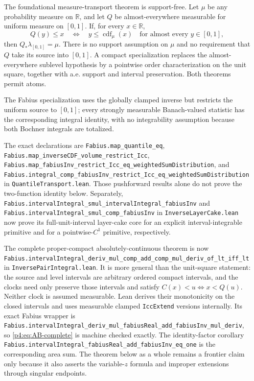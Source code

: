 \documentclass[11pt,oneside]{article}
\theoremstyle{definition}
\theoremstyle{remark}
\newcommand{\R}{\mathbb R}
\newcommand{\1}{\mathbf 1}
\begin{document}
\begin{statusbox}
The foundational measure-transport theorem is support-free.  Let \(\mu\) be any
probability measure on \(\R\), and let \(Q\) be almost-everywhere measurable for uniform
measure on \([0,1]\).  If, for every \(x\in\R\),
\[
 Q(y)\le x\quad\Longleftrightarrow\quad y\le\operatorname{cdf}_{\mu}(x)
 \quad\text{for almost every \(y\in[0,1]\)},
\]
then \(Q_*\lambda_{[0,1]}=\mu\).  There is no support assumption on \(\mu\) and no
requirement that \(Q\) take its source into \([0,1]\).  A compact specialization replaces
the almost-everywhere sublevel hypothesis by a pointwise order characterization on the
unit square, together with a.e. support and interval preservation.  Both theorems permit
atoms.

The Fabius specialization uses the globally clamped inverse but restricts the uniform
source to \([0,1]\); every strongly measurable Banach-valued statistic has the
corresponding integral identity,
with no integrability assumption because both Bochner integrals are totalized.

The exact declarations are
\nolinkurl{Fabius.map_quantile_eq},
\nolinkurl{Fabius.map_inverseCDF_volume_restrict_Icc},
\nolinkurl{Fabius.map_fabiusInv_restrict_Icc_eq_weightedSumDistribution}, and
\nolinkurl{Fabius.integral_comp_fabiusInv_restrict_Icc_eq_weightedSumDistribution}
in \texttt{QuantileTransport.lean}.  Those pushforward results alone do not prove the
two-function identity below.  Separately,
\nolinkurl{Fabius.intervalIntegral_smul_intervalIntegral_fabiusInv} and
\nolinkurl{Fabius.intervalIntegral_smul_comp_fabiusInv} in
\texttt{InverseLayerCake.lean} now prove its full-unit-interval layer-cake core for an
explicit interval-integrable primitive and for a pointwise-\(C^1\) primitive,
respectively.

The complete proper-compact absolutely-continuous theorem is now
\nolinkurl{Fabius.intervalIntegral_deriv_mul_comp_add_comp_mul_deriv_of_lt_iff_lt}
in \texttt{InversePairIntegral.lean}.  It is more general than the unit-square statement:
the source and level intervals are arbitrary ordered compact intervals, and the clocks
need only preserve those intervals and satisfy
\(C(x)<u\Longleftrightarrow x<Q(u)\).  Neither clock is assumed measurable.  Lean derives
their monotonicity on the closed intervals and uses measurable clamped
\texttt{IccExtend} versions internally.  Its exact Fabius wrapper is
\nolinkurl{Fabius.intervalIntegral_deriv_mul_fabiusReal_add_fabiusInv_mul_deriv},
so \cref{p4:eq:AB-complete} is machine checked exactly.  The identity-factor corollary
\nolinkurl{Fabius.intervalIntegral_fabiusReal_add_fabiusInv_eq_one} is the corresponding
area sum.  The theorem below as a whole remains a frontier claim only because it also
asserts the variable-\(z\) formula and improper extensions through singular endpoints.
\end{statusbox}
\end{document}
